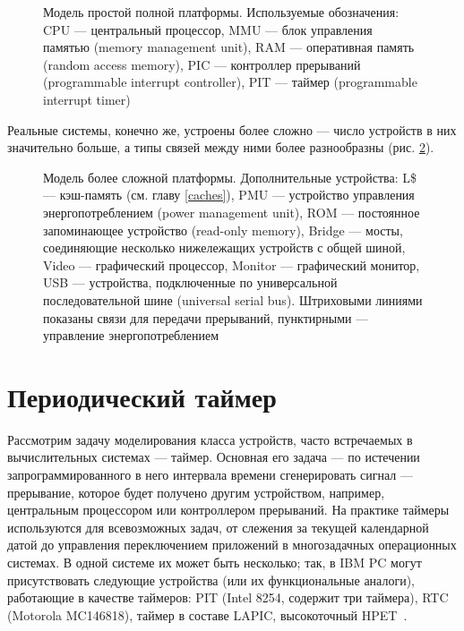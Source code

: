\begin{figure}[htp]
    \centering
    \caption[Модель простой полной платформы]{Модель простой полной платформы. Используемые обозначения: CPU — центральный процессор, MMU — блок управления памятью (\abbr memory management unit), RAM — оперативная память (\abbr random access memory), PIC — контроллер прерываний (\abbr programmable interrupt controller), PIT — таймер (\abbr programmable interrupt timer)}
    \label{fig:full-platform}
\end{figure}

Реальные системы, конечно же, устроены более сложно — число устройств в них значительно больше, а типы связей между ними более разнообразны (рис. \ref{fig:real-full-platform}).

\begin{figure}[htp]
    \centering
    \caption[Модель более сложной платформы]{Модель более сложной платформы. Дополнительные устройства: L\$ — кэш-память (см. главу \ref{caches}), PMU — устройство управления энергопотреблением (\abbr power management unit), ROM — постоянное запоминающее устройство (\abbr read-only memory), Bridge — мосты, соединяющие несколько нижележащих устройств с общей шиной, Video — графический процессор, Monitor — графический монитор, USB — устройства, подключенные по универсальной последовательной шине (\abbr universal serial bus). Штриховыми линиями показаны связи для передачи прерываний, пунктирными — управление энергопотреблением}
    \label{fig:real-full-platform}
\end{figure}

\section{Периодический таймер}

Рассмотрим задачу моделирования класса устройств, часто встречаемых в вычислительных системах — таймер. Основная его задача — по истечении запрограммированного в него интервала времени сгенерировать сигнал — прерывание, которое будет получено другим устройством, например, центральным процессором или контроллером прерываний. На практике таймеры используются для всевозможных задач, от слежения за текущей календарной датой до управления переключением приложений в многозадачных операционных системах. В одной системе их может быть несколько; так, в IBM PC могут присутствовать следующие устройства (или их функциональные аналоги), работающие в качестве таймеров: PIT (Intel 8254, содержит три таймера), RTC (Motorola MC146818), таймер в составе LAPIC, высокоточный HPET~\citep{hpet}.

